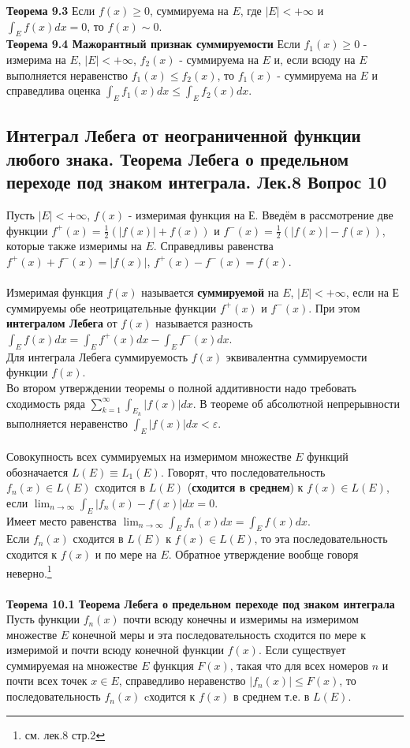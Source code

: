 \documentclass{article}
\begin{document}
	\textbf{Теорема 9.3} Если $f(x)\ge 0$, суммируема на $E$, где $|E|<+\infty$ и $\int_{E} f(x)dx=0$, то $f(x)\sim 0$.\\
	
	\textbf{Теорема 9.4 Мажорантный признак суммируемости} Если ${f}_{1}(x)\ge 0$ - измерима на $E$, $|E|<+\infty$,
	${f}_{2}(x)$ - суммируема на $E$ и, если всюду на $E$ выполняется неравенство ${f}_{1}(x)\le {f}_{2}(x)$, то ${f}_{1}(x)$ - суммируема на $E$ и справедлива оценка $\int_{E} {f}_{1}(x)dx\le \int_{E} {f}_{2}(x)dx$.\\
\subsection{Интеграл Лебега от неограниченной функции любого знака. Теорема Лебега о предельном переходе под знаком интеграла. Лек.8 \textbf{Вопрос 10}}
	Пусть $|E|<+\infty$, $f(x)$ - измеримая функция на $Е$. Введём в рассмотрение две функции $f^{+}(x)=\frac{1}{2}(|f(x)|+f(x))$ и  $f^{-}(x)=\frac{1}{2}(|f(x)|-f(x))$, которые также измеримы на $E$.  Справедливы равенства $f^{+}(x)+f^{-}(x)=|f(x)|$,  $f^{+}(x)-f^{-}(x)=f(x)$.\\
	\\
	Измеримая функция $f(x)$ называется \textbf{суммируемой} на $E$, $|E|<+\infty$, если на $Е$ суммируемы обе неотрицательные функции  $f^{+}(x)$ и $f^{-}(x)$. При этом \textbf{интегралом Лебега} от $f(x)$ называется разность $\int_{E} f(x)dx=\int_{E} f^{+}(x)dx-\int_{E} f^{-}(x)dx$.\\
	Для интеграла Лебега суммируемость $f(x)$ эквивалентна суммируемости функции $f(x)$.\\
	Во втором утверждении теоремы о полной аддитивности надо требовать сходимость ряда $\sum_{k=1}^{\infty} \int_{E_{k}} |f(x)|dx$. В теореме об абсолютной непрерывности выполняется неравенство $\int_{E} |f(x)|dx<\varepsilon$.\\
	\\
	Совокупность всех суммируемых на измеримом множестве $E$ функций обозначается $L(E)\equiv L_{1}(E)$. Говорят, что последовательность  $f_{n}(x)\in L(E)$ сходится в $L(E)$ (\textbf{сходится в среднем}) к $f(x)\in L(E)$, если $\lim _{n \rightarrow \infty}\int_{E}\left|f_{n}(x)-f(x)\right|dx=0$.\\ 
	Имеет место равенства $\lim _{n \rightarrow \infty}\int_{E}f_{n}(x)dx=\int_{E}f(x)dx$.\\
	Если ${f_{n}(x)}$ сходится в $L(E)$ к $f(x)\in L(E)$, то эта
	последовательность сходится к $f(x)$ и по мере на $E$. Обратное утверждение вообще говоря неверно.\footnote{см. лек.8 стр.2}\\
	\\
	\textbf{Теорема 10.1 Теорема Лебега о предельном переходе под знаком интеграла}
	Пусть функции $f_{n}(x)$ почти всюду конечны и измеримы на измеримом множестве $E$ конечной меры и эта последовательность сходится
	по мере к измеримой и почти всюду конечной функции $f(x)$. Если существует суммируемая на множестве $E$ функция $F(x)$, такая что для всех номеров $n$ и почти всех точек $x\in E$, справедливо неравенство $|f_{n}(x)|\le F(x)$, то последовательность ${f_{n}(x)}$ cходится к $f(x)$ в среднем т.е. в $L(E)$.\\
\end{document}
